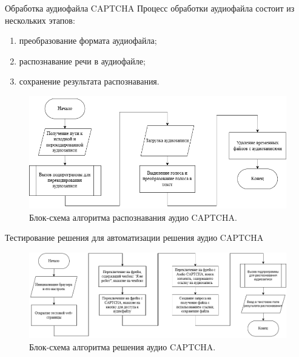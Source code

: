 \documentclass[12pt,a4paper,mathserif]{beamer}
\begin{document}
\begin{frame}{Обработка аудиофайла CAPTCHA}
    \setlength{\parindent}{0.5cm}
    Процесс обработки аудиофайла состоит из нескольких этапов:
    
    \begin{enumerate}
        \item преобразование формата аудиофайла;
        \item распознавание речи в аудиофайле;
        \item сохранение результата распознавания.
    \end{enumerate}

    \begin{figure}[H]
        \centering
        \includegraphics[width=0.8\linewidth]{imgs/flowchart-asr.png}
        \caption{Блок-схема алгоритма распознавания аудио CAPTCHA.}
    \end{figure}
\end{frame}

\begin{frame}{\small Тестирование решения для автоматизации решения аудио CAPTCHA}
    \begin{figure}
        \centering
        \includegraphics[width=1\linewidth]{imgs/flowchart-solve.png}
        \caption{Блок-схема алгоритма решения аудио CAPTCHA.}
    \end{figure}
\end{frame}
\end{document}
